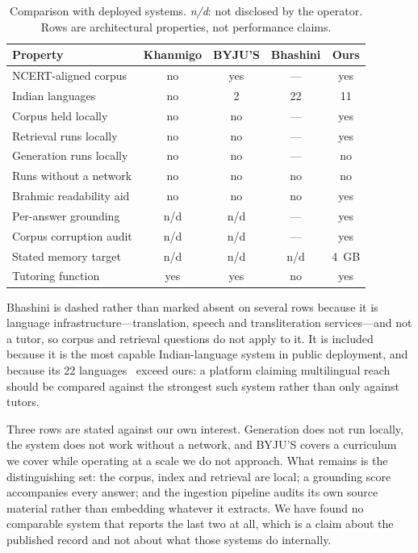 \documentclass[conference]{IEEEtran}
\begin{document}
\begin{table}[htbp]
\caption{Comparison with deployed systems. \emph{n/d}: not disclosed by the operator. Rows are architectural properties, not performance claims.}
\label{tab:comparison}
\centering
\footnotesize
\begin{tabular}{@{}lcccc@{}}
\toprule
\textbf{Property} & \textbf{Khanmigo} & \textbf{BYJU'S} & \textbf{Bhashini} & \textbf{Ours} \\
\midrule
NCERT-aligned corpus     & no  & yes & ---  & yes \\
Indian languages         & no  & 2   & 22   & 11 \\
Corpus held locally      & no  & no  & ---  & yes \\
Retrieval runs locally   & no  & no  & ---  & yes \\
Generation runs locally  & no  & no  & ---  & no  \\
Runs without a network   & no  & no  & no   & no  \\
Brahmic readability aid  & no  & no  & no   & yes \\
Per-answer grounding     & n/d & n/d & ---  & yes \\
Corpus corruption audit  & n/d & n/d & ---  & yes \\
Stated memory target     & n/d & n/d & n/d  & 4~GB \\
Tutoring function        & yes & yes & no   & yes \\
\bottomrule
\end{tabular}
\end{table}

Bhashini is dashed rather than marked absent on several rows because it is language infrastructure---translation, speech and transliteration services---and not a tutor, so corpus and retrieval questions do not apply to it. It is included because it is the most capable Indian-language system in public deployment, and because its 22 languages~\cite{b22} exceed ours: a platform claiming multilingual reach should be compared against the strongest such system rather than only against tutors.

Three rows are stated against our own interest. Generation does not run locally, the system does not work without a network, and BYJU'S covers a curriculum we cover while operating at a scale we do not approach. What remains is the distinguishing set: the corpus, index and retrieval are local; a grounding score accompanies every answer; and the ingestion pipeline audits its own source material rather than embedding whatever it extracts. We have found no comparable system that reports the last two at all, which is a claim about the published record and not about what those systems do internally.
\end{document}
